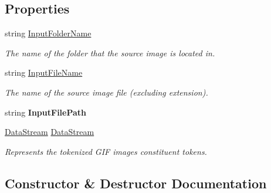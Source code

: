 \subsection*{Properties}
\begin{DoxyCompactItemize}
\item 
string \hyperlink{classvcvj_1_1_vcvj_image_a2a21889ea8a2dac7832e69b224e47732}{Input\+Folder\+Name}
\begin{DoxyCompactList}\small\item\em The name of the folder that the source image is located in. \end{DoxyCompactList}\item 
string \hyperlink{classvcvj_1_1_vcvj_image_a34afafb554b739cd21a3ad8b71007462}{Input\+File\+Name}
\begin{DoxyCompactList}\small\item\em The name of the source image file (excluding extension). \end{DoxyCompactList}\item 
string {\bfseries Input\+File\+Path}\hypertarget{classvcvj_1_1_vcvj_image_adba0cc00bee473c2737a0a8de9ef10ec}{}\label{classvcvj_1_1_vcvj_image_adba0cc00bee473c2737a0a8de9ef10ec}

\item 
\hyperlink{classvcvj_1_1_models_1_1_grammatical___components_1_1_data_stream}{Data\+Stream} \hyperlink{classvcvj_1_1_vcvj_image_af7be319d59a08f70d624631d8f1bccbd}{Data\+Stream}
\begin{DoxyCompactList}\small\item\em Represents the tokenized G\+IF image\textquotesingle{}s constituent tokens. \end{DoxyCompactList}\end{DoxyCompactItemize}


\subsection{Constructor \& Destructor Documentation}
